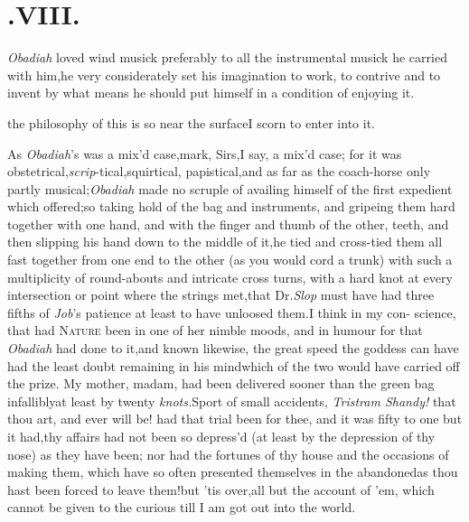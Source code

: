 \documentclass{article}
\begin{document}
\section{.\quad  VIII.}

 \textit{Obadiah} loved wind musick pre\-ferably to all the instrumental
mu\-sick he carried with him,\tsk he very considerately set his imagination to work, to
contrive and to invent by what means he should put himself in a condition of
enjoying it.

\tsh the philosophy of this is so near the
surface\tsk I scorn to enter into it.

As \textit{Obadiah}’s was a mix’d case,\tsh mark,
Sirs,\tsh I say, a mix’d case; for it was
obstetrical,\tsk \textit{scrip}-tical,\tsk squirtical,
papistical,\tsk and as far as the coach-horse
 only partly
musical;\tsk \textit{Obadiah} made no scruple of availing himself
of the first expedient which offered;\tsk so taking hold of the bag and
instruments, and gripeing them hard together with one hand, and with the finger and thumb
of the other,  teeth, and
then slipping his hand down to the middle of it,\tsk he tied and
cross-tied them all fast together from one end to the other (as you
would cord a trunk) with such a multiplicity of round-abouts and
intricate cross turns, with a hard knot at every intersection or
point where the strings met,\tsk that Dr.\@ \textit{Slop} must have
had three fifths of \textit{Job}’s patience at least to have
unloosed them.\tsk I think in my
con-\break
science, that had \textsc{Nature} been in one of
her nimble moods, and in humour for
 that \textit{Obadiah} had done to
it,\tsk and known likewise, the great speed the goddess can
 have had the least doubt
remaining in his mind\tsk which of the two would have carried off
the prize. My mother, madam, had been delivered sooner than the
green bag infallibly\tsh at least by twenty \textit{knots.}\tsh Sport
of small accidents, \textit{Trist\-ram Shandy!} that thou art, and ever
will be! had that trial been for thee, and it was fifty to one but
it had,\tsh thy affairs had not been so
depress’d\tsk
(at least by the depression of thy nose) as
they have been; nor had the fortunes of thy house and the occasions
of making them, which have so often presented themselves in
the
abandoned\tsk as thou hast been forced
to leave them!\tsk but ’tis over,\tsk all
but the account of ’em, which cannot be given to the curious
till I am got out into the world.
\end{document}
